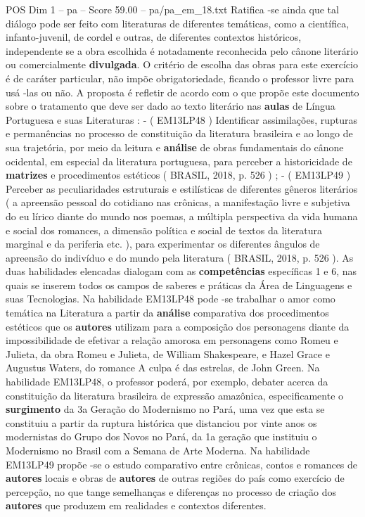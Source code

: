 \begin{textsample}{POS Dim 1 – pa – Score 59.00 – pa/pa\_em\_18.txt}
Ratifica -se ainda que tal diálogo pode ser feito com literaturas de diferentes temáticas, como a científica, infanto-juvenil, de cordel e outras, de diferentes contextos históricos, independente se a obra escolhida é notadamente reconhecida pelo cânone literário ou comercialmente \textbf{divulgada}.
O critério de escolha das obras para este exercício é de caráter particular, não impõe obrigatoriedade, ficando o professor livre para usá -las ou não.
A proposta é refletir de acordo com o que propõe este documento sobre o tratamento que deve ser dado ao texto literário nas \textbf{aulas} de Língua Portuguesa e suas Literaturas : - ( EM13LP48 ) Identificar assimilações, rupturas e permanências no processo de constituição da literatura brasileira e ao longo de sua trajetória, por meio da leitura e \textbf{análise} de obras fundamentais do cânone ocidental, em especial da literatura portuguesa, para perceber a historicidade de \textbf{matrizes} e procedimentos estéticos ( BRASIL, 2018, p. 526 ) ; - ( EM13LP49 ) Perceber as peculiaridades estruturais e estilísticas de diferentes gêneros literários ( a apreensão pessoal do cotidiano nas crônicas, a manifestação livre e subjetiva do eu lírico diante do mundo nos poemas, a múltipla perspectiva da vida humana e social dos romances, a dimensão política e social de textos da literatura marginal e da periferia etc. ), para experimentar os diferentes ângulos de apreensão do indivíduo e do mundo pela literatura ( BRASIL, 2018, p. 526 ).
As duas habilidades elencadas dialogam com as \textbf{competências} específicas 1 e 6, nas quais se inserem todos os campos de saberes e práticas da Área de Linguagens e suas Tecnologias.
Na habilidade EM13LP48 pode -se trabalhar o amor como temática na Literatura a partir da \textbf{análise} comparativa dos procedimentos estéticos que os \textbf{autores} utilizam para a composição dos personagens diante da impossibilidade de efetivar a relação amorosa em personagens como Romeu e Julieta, da obra Romeu e Julieta, de William Shakespeare, e Hazel Grace e Augustus Waters, do romance A culpa é das estrelas, de John Green.
Na habilidade EM13LP48, o professor poderá, por exemplo, debater acerca da constituição da literatura brasileira de expressão amazônica, especificamente o \textbf{surgimento} da 3a Geração do Modernismo no Pará, uma vez que esta se constituiu a partir da ruptura histórica que distanciou por vinte anos os modernistas do Grupo dos Novos no Pará, da 1a geração que instituiu o Modernismo no Brasil com a Semana de Arte Moderna.
Na habilidade EM13LP49 propõe -se o estudo comparativo entre crônicas, contos e romances de \textbf{autores} locais e obras de \textbf{autores} de outras regiões do país como exercício de percepção, no que tange semelhanças e diferenças no processo de criação dos \textbf{autores} que produzem em realidades e contextos diferentes.

\end{textsample}
